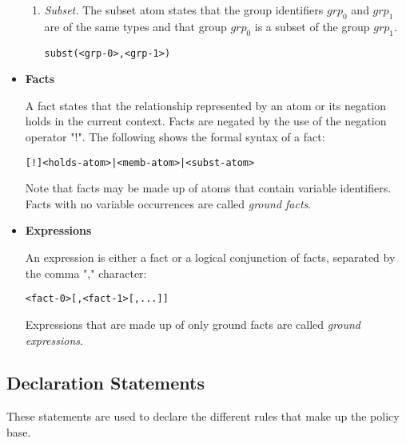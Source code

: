 \documentclass[11pt]{report}
\newenvironment{vverbatim}
{
  \begin{alltt}
}
{
    \vspace{-\baselineskip}
  \end{alltt}
}
\begin{document}
\begin{itemize}
\begin{enumerate}
              \item
                {\em Subset.} The subset atom states that the group
                identifiers $grp_0$ and $grp_1$ are of the same types and
                that group $grp_0$ is a subset of the group $grp_1$.

                \begin{vverbatim}
  subst(<grp-0>, <grp-1>)
                \end{vverbatim}

            \end{enumerate}

          \item
            {\bf Facts}

            A fact states that the relationship represented by an atom or
            its negation holds in the current context. Facts are negated by
            the use of the negation operator "!". The following shows the
            formal syntax of a fact:

            \begin{vverbatim}
  [!]<holds-atom> | <memb-atom> | <subst-atom>
            \end{vverbatim}

            Note that facts may be made up of atoms that contain variable
            identifiers. Facts with no variable occurrences are called
            {\em ground facts}.

          \item
            {\bf Expressions}

            An expression is either a fact or a logical conjunction of facts,
            separated by the comma "," character:

            \begin{vverbatim}
  <fact-0> [, <fact-1> [, ...]]
            \end{vverbatim}

            Expressions that are made up of only ground facts are called
            {\em ground expressions}.
        \end{itemize}

      \subsection{Declaration Statements}
        \label{subs-langl-decls}

        These statements are used to declare the different rules that make up
        the policy base.
\end{document}
